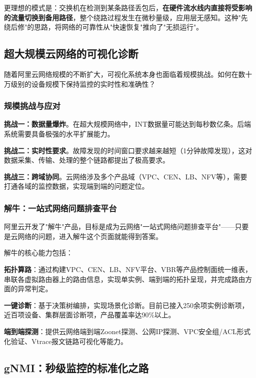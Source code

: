 更理想的模式是：交换机在检测到某条路径丢包后，\textbf{在硬件流水线内直接将受影响的流量切换到备用路径}，整个绕路过程发生在微秒量级，应用层无感知。这种"先绕后修"的思路，将网络的可靠性从"快速恢复"推向了"无损运行"。

\subsection{超大规模云网络的可视化诊断}

随着阿里云网络规模的不断扩大，可视化系统本身也面临着规模挑战。如何在数十万级别的设备规模下保持监控的实时性和准确性？

\subsubsection{规模挑战与应对}

\textbf{挑战一：数据量爆炸}。在超大规模网络中，INT数据量可能达到每秒数亿条。后端系统需要具备极强的水平扩展能力。

\textbf{挑战二：实时性要求}。故障发现的时间窗口要求越来越短（1分钟故障发现），这对数据采集、传输、处理的整个链路都提出了极高要求。

\textbf{挑战三：跨域协同}。云网络涉及多个产品域（VPC、CEN、LB、NFV等），需要打通各域的监控数据，实现端到端的问题定位。

\subsubsection{解牛：一站式网络问题排查平台}

阿里云开发了"解牛"产品，目标是成为云网络"一站式网络问题排查平台"——只要是云网络的问题，进入解牛这个页面就能得到答案。

解牛的核心能力包括：

\textbf{拓扑算路}：通过构建VPC、CEN、LB、NFV平台、VBR等产品控制面统一维表，串联各虚拟路由器上的路由信息，实现单实例、端到端的拓扑呈现，并完成路由方面的异常判定。

\textbf{一键诊断}：基于决策树编排，实现场景化诊断。目前已接入250余项实例诊断项，近百项设备、集群层面诊断项，产品覆盖率达90\%以上。

\textbf{端到端探测}：提供云网络端到端Zoonet探测、公网IP探测、VPC安全组/ACL形式化验证、Vtrace报文链路可视化等能力。

\subsection{gNMI：秒级监控的标准化之路}

